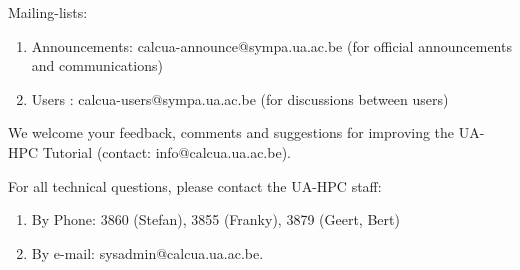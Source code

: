 Mailing-lists:

\begin{enumerate}
\item  Announcements: calcua-announce@sympa.ua.ac.be (for official announcements and communications)
\item  Users : calcua-users@sympa.ua.ac.be (for discussions between users)
\end{enumerate}


We welcome your feedback, comments and suggestions for improving the UA-HPC
Tutorial  (contact: info@calcua.ua.ac.be).

For all technical questions, please contact the UA-HPC staff:

\begin{enumerate}
\item  By Phone: 3860 (Stefan), 3855 (Franky), 3879 (Geert, Bert)
\item  By e-mail:  sysadmin@calcua.ua.ac.be.
\end{enumerate}
